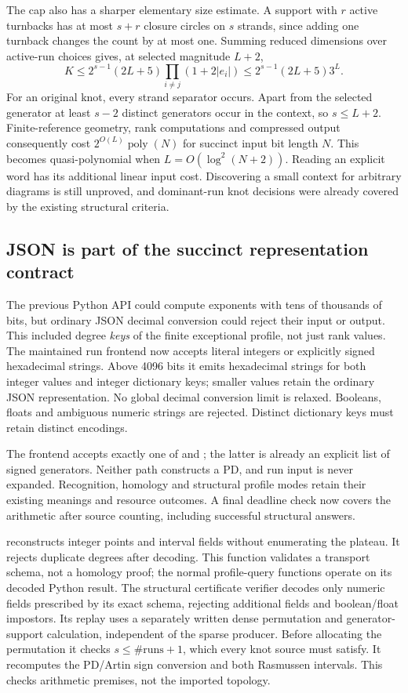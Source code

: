The cap also has a sharper elementary size estimate.  A support with $r$
active turnbacks has at most $s+r$ closure circles on $s$ strands, since
adding one turnback changes the count by at most one.  Summing reduced
dimensions over active-run choices gives, at selected magnitude $L+2$,
\[
 K\le2^{s-1}(2L+5)\prod_{i\ne j}(1+2|e_i|)
   \le2^{s-1}(2L+5)3^L.
\]
For an original knot, every strand separator occurs.  Apart from the
selected generator at least $s-2$ distinct generators occur in the context,
so $s\le L+2$.  Finite-reference geometry, rank computations and compressed
output consequently cost $2^{O(L)}\operatorname{poly}(N)$ for succinct
input bit length $N$.  This becomes quasi-polynomial when
$L=O(\log^2(N+2))$.  Reading an explicit word has its additional linear
input cost.  Discovering a small context for arbitrary diagrams is still
unproved, and dominant-run knot decisions were already covered by the
existing structural criteria.

\subsection{JSON is part of the succinct representation contract}
The previous Python API could compute exponents with tens of thousands of
bits, but ordinary JSON decimal conversion could reject their input or
output.  This included degree \emph{keys} of the finite exceptional profile,
not just rank values.  The maintained run frontend now accepts literal
integers or explicitly signed hexadecimal strings.  Above 4096 bits it emits
hexadecimal strings for both integer values and integer dictionary keys;
smaller values retain the ordinary JSON representation.  No global decimal
conversion limit is relaxed.  Booleans, floats and ambiguous numeric strings
are rejected.  Distinct dictionary keys must retain distinct encodings.

The frontend accepts exactly one of  and ; the latter
is already an explicit list of signed generators.  Neither path constructs
a PD, and run input is never expanded.  Recognition, homology and structural
profile modes retain their existing meanings and resource outcomes.
A final deadline check now covers the arithmetic after source counting,
including successful structural answers.

 reconstructs integer points and interval
fields without enumerating the plateau.  It rejects duplicate degrees after
decoding.  This function validates a transport schema, not a homology proof;
the normal profile-query functions operate on its decoded Python result.
The structural certificate verifier decodes only numeric fields prescribed
by its exact schema, rejecting additional fields and boolean/float impostors.
Its replay uses a separately written dense permutation and generator-support
calculation, independent of the sparse producer.  Before allocating the
permutation it checks $s\le\#\text{runs}+1$, which every knot source must
satisfy.  It recomputes the PD/Artin sign conversion and both Rasmussen
intervals.  This checks arithmetic premises, not the imported topology.

